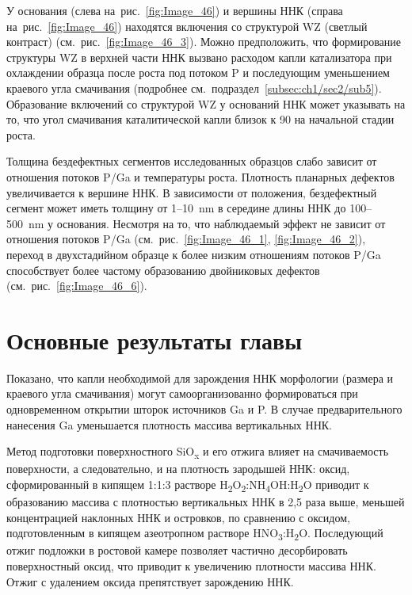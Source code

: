 У основания (слева на~рис.~\cref{fig:Image_46}) и вершины ННК (справа
на~рис.~\cref{fig:Image_46}) находятся включения со структурой WZ (светлый
контраст) (см.~рис.~\cref{fig:Image_46_3}). Можно предположить, что
формирование структуры WZ в верхней части ННК вызвано расходом капли
катализатора при охлаждении образца после роста под потоком P и последующим
уменьшением краевого угла смачивания (подробнее
см.~подраздел~\cref{subsec:ch1/sec2/sub5}).  Образование включений со
структурой WZ у оснований ННК может указывать на то, что угол смачивания
каталитической капли близок к 90{\textdegree} на начальной стадии роста.

Толщина бездефектных сегментов исследованных образцов слабо зависит от
отношения потоков P/Ga и температуры роста. Плотность планарных дефектов
увеличивается к вершине ННК. В зависимости от положения, бездефектный сегмент
может иметь толщину от 1--10~\si{\nano\meter} в середине длины ННК до
100--500~\si{\nano\meter} у основания. Несмотря на то, что наблюдаемый эффект
не зависит от отношения потоков P/Ga (см.~рис.~\cref{fig:Image_46_1},
\cref{fig:Image_46_2}), переход в двухстадийном образце к более низким
отношениям потоков P/Ga способствует более частому образованию двойниковых
дефектов (см.~рис.~\cref{fig:Image_46_6}).

\section{Основные результаты главы}\label{sec:ch5/sec8}

Показано, что капли необходимой для зарождения ННК морфологии (размера и
краевого угла смачивания) могут самоорганизованно формироваться при
одновременном открытии шторок источников Ga и P. В случае предварительного
нанесения Ga уменьшается плотность массива вертикальных ННК.

Метод подготовки поверхностного SiO\textsubscript{x} и его отжига влияет на
смачиваемость поверхности, а следовательно, и на плотность зародышей ННК:
оксид, сформированный в кипящем 1:1:3 растворе
H\textsubscript{2}O\textsubscript{2}:NH\textsubscript{4}OH:H\textsubscript{2}O
приводит к образованию массива с плотностью вертикальных ННК в 2,5 раза выше,
меньшей концентрацией наклонных ННК и островков, по сравнению с оксидом,
подготовленным в кипящем азеотропном растворе
HNO\textsubscript{3}:H\textsubscript{2}O. Последующий отжиг подложки в ростовой
камере позволяет частично десорбировать поверхностный оксид, что приводит к
увеличению плотности массива ННК. Отжиг с удалением оксида препятствует
зарождению ННК.

